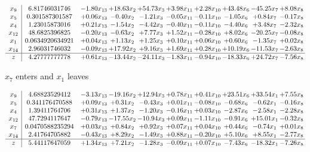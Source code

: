 \documentclass[9pt]{article}
\begin{document}
 \[\begin{array}{c| c c@{\hskip 2pt} c@{\hskip 2pt} c@{\hskip 2pt} c@{\hskip 2pt} c@{\hskip 2pt} c@{\hskip 2pt} c@{\hskip 2pt} c@{\hskip 2pt} }
 x_{9}   &  6.81746031746 & -1.80 x_{13} & + 18.63 x_{2} & + 54.73 x_{3} & +  3.98 x_{11} & +  2.28 x_{10} & + 43.48 x_{6} & -45.25 x_{7} & +  8.08 x_{8}\\
 x_{5}   &  0.301587301587 & +  0.06 x_{13} & -0.40 x_{2} & -1.21 x_{3} & -0.05 x_{11} & -0.11 x_{10} & -1.05 x_{6} & +  0.84 x_{7} & -0.17 x_{8}\\
 x_{4}   &  1.23015873016 & +  0.21 x_{13} & -1.54 x_{2} & -4.42 x_{3} & -0.40 x_{11} & -0.11 x_{10} & -4.40 x_{6} & +  3.48 x_{7} & -2.32 x_{8}\\
 x_{12}   &  48.6825396825 & -0.20 x_{13} & -0.63 x_{2} & +  7.77 x_{3} & +  1.52 x_{11} & -0.28 x_{10} & +  8.02 x_{6} & -20.25 x_{7} & -0.08 x_{8}\\
 x_{1}   &  0.0634920634921 & +  0.04 x_{13} & +  1.13 x_{2} & +  1.25 x_{3} & +  0.10 x_{11} & +  0.06 x_{10} & +  0.60 x_{6} & -1.35 x_{7} & +  0.02 x_{8}\\
 x_{14}   &  2.96031746032 & -0.09 x_{13} & + 17.92 x_{2} & +  9.16 x_{3} & +  1.69 x_{11} & +  0.28 x_{10} & + 10.19 x_{6} & -11.53 x_{7} & -2.63 x_{8}\\
\hline
z    &  4.27777777778 & +  0.61 x_{13} & -13.44 x_{2} & -24.11 x_{3} & -1.83 x_{11} & -0.94 x_{10} & -18.33 x_{6} & + 24.72 x_{7} & -7.56 x_{8}\\
\end{array}\]


 $ x_{7} $ enters and $ x_{1} $ leaves 

 \[\begin{array}{c| c c@{\hskip 2pt} c@{\hskip 2pt} c@{\hskip 2pt} c@{\hskip 2pt} c@{\hskip 2pt} c@{\hskip 2pt} c@{\hskip 2pt} c@{\hskip 2pt} }
 x_{9}   &  4.68823529412 & -3.13 x_{13} & -19.16 x_{2} & + 12.94 x_{3} & +  0.78 x_{11} & +  0.41 x_{10} & + 23.51 x_{6} & + 33.54 x_{1} & +  7.55 x_{8}\\
 x_{5}   &  0.341176470588 & +  0.09 x_{13} & +  0.31 x_{2} & -0.43 x_{3} & +  0.01 x_{11} & -0.08 x_{10} & -0.68 x_{6} & -0.62 x_{1} & -0.16 x_{8}\\
 x_{4}   &  1.39411764706 & +  0.31 x_{13} & +  1.37 x_{2} & -1.20 x_{3} & -0.16 x_{11} & +  0.03 x_{10} & -2.87 x_{6} & -2.58 x_{1} & -2.28 x_{8}\\
 x_{12}   &  47.7294117647 & -0.79 x_{13} & -17.55 x_{2} & -10.94 x_{3} & +  0.09 x_{11} & -1.11 x_{10} & -0.91 x_{6} & + 15.01 x_{1} & -0.32 x_{8}\\
 x_{7}   &  0.0470588235294 & +  0.03 x_{13} & +  0.84 x_{2} & +  0.92 x_{3} & +  0.07 x_{11} & +  0.04 x_{10} & +  0.44 x_{6} & -0.74 x_{1} & +  0.01 x_{8}\\
 x_{14}   &  2.41764705882 & -0.43 x_{13} & +  8.29 x_{2} & -1.49 x_{3} & +  0.88 x_{11} & -0.20 x_{10} & +  5.10 x_{6} & +  8.55 x_{1} & -2.77 x_{8}\\
\hline
z    &  5.44117647059 & +  1.34 x_{13} & +  7.21 x_{2} & -1.28 x_{3} & -0.09 x_{11} & +  0.07 x_{10} & -7.43 x_{6} & -18.32 x_{1} & -7.26 x_{8}\\
\end{array}\]
\end{document}
